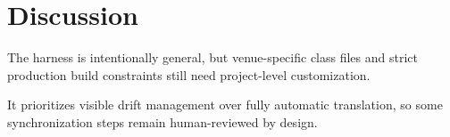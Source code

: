 \section{Discussion}

The harness is intentionally general, but venue-specific class files and strict production build constraints still need project-level customization.

It prioritizes visible drift management over fully automatic translation, so some synchronization steps remain human-reviewed by design.

